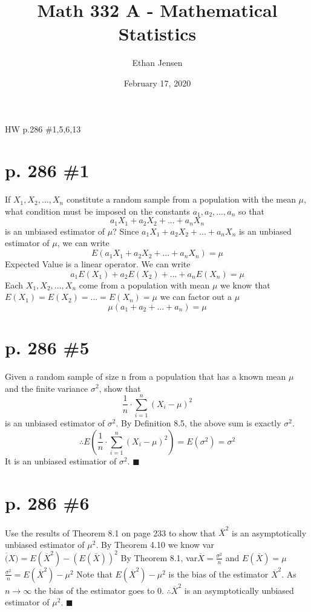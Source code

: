 \documentclass[12pt]{article}
\title{Math 332 A - Mathematical Statistics}
\author{Ethan Jensen}
\date{February 17, 2020}
\begin{document}
	\maketitle HW p.286 \#1,5,6,13
	\section[20pt]{p. 286 \#1}
	If \(X_1,X_2,...,X_n\) constitute a random sample from a population with the mean \(\mu\), what condition must be imposed on the constants \(a_1,a_2,...,a_n\) so that
	\[a_1X_1 + a_2X_2 + ... + a_nX_n\] is an unbiased estimator of \(\mu\)? \newline \newline
	Since \(a_1X_1 + a_2X_2 + ... + a_nX_n\) is an unbiased estimator of \(\mu\), we can write
	\[E(a_1X_1 + a_2X_2 + ... + a_nX_n) = \mu\]
	Expected Value is a linear operator. We can write
	\[a_1E(X_1)+ a_2E(X_2)+...+a_nE(X_n) = \mu\]
	Each \(X_1,X_2,...,X_n\) come from a population with mean \(\mu\) we know that \(E(X_1)=E(X_2)=...=E(X_n)=\mu\) we can factor out a \(\mu\)
	\[\mu(a_1+a_2+...+a_n) = \mu\]
	\newpage
	\section[20pt]{p. 286 \#5}
	Given a random sample of size n from a population that has a known mean \(\mu\) and the finite variance \(\sigma^2\), show that \[\frac{1}{n} \cdot \sum_{i=1}^n(X_i-\mu)^2\] is an unbiased estimator of \(\sigma^2\). \newline \newline
	By Definition 8.5, the above sum is exactly \(\sigma^2\).
	\[\therefore E\left(\frac{1}{n} \cdot \sum_{i=1}^n(X_i-\mu)^2\right) = E(\sigma^2) = \sigma^2\]
	It is an unbiased estimatior of \(\sigma^2\). \newline
	\(\blacksquare\)
	\newpage
	\section[20pt]{p. 286 \#6}
	Use the results of Theorem 8.1 on page 233 to show that \(\overline{X}^2\) is an asymptotically unbiased estimator of \(\mu^2\). \newline \newline
	By Theorem 4.10 we know \newline
	var\(\overline(X) = E(\overline{X}^2) - (E(\overline{X}))^2\)
	\newline \newline
	By Theorem 8.1, var\(\overline{X}=\frac{\sigma^2}{n}\) and \(E(\overline{X})=\mu\)
	\newline
	\(\frac{\sigma^2}{n} = E(\overline{X}^2) - \mu^2\)
	\newline \newline
	Note that \(E(\overline{X}^2) - \mu^2\) is the bias of the estimator \(\overline{X}^2\). \newline
	As \(n \rightarrow \infty\) the bias of the estimator goes to 0. \newline
	\(\therefore \overline{X}^2\) is an asymptotically unbiased estimator of \(\mu^2\). \newline
	\(\blacksquare\)
	\newpage
\end{document}
